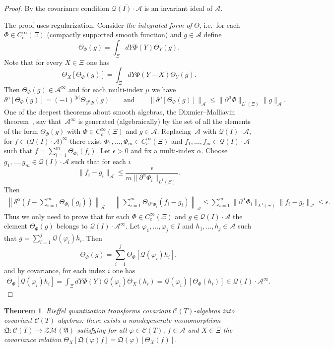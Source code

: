 \documentclass[pdftex]{sigma}
\def\A{{\mathcal A}}
\def\Th{\Theta}
\def\QQ{\mathfrak Q}
\def\AA{\mathfrak A}
\def\C{\mathcal{C}}
\def\Q{\mathcal Q}
\newtheorem{Theorem}{Theorem}[section]
\begin{document}
\begin{proof}
By the covariance condition $\overline{\Q(I)\cdot\A}$ is an invariant ideal of $\A$.

The proof uses regularization. Consider {\it the integrated form of} $\Th$, i.e.\ for each $\Phi\in C_c^\infty(\Xi)$
(compactly supported smooth function) and $g\in\A$ def\/ine
\[
\Th_\Phi(g)=\int_\Xi dY\Phi(Y)\Th_Y(g).
\]
Note that for every $X\in\Xi$ one has
\[
\Th_X\left[\Th_\Phi(g)\right]=\int_\Xi dY\Phi(Y-X)\Th_Y(g).
\]
Then $\Th_\Phi(g)\in\A^\infty$ and for each multi-index $\mu$ we have
\[
\delta^{\mu}\left[\Th_\Phi(g)\right]=(-1)^{|\mu|}\Th_{\partial^{\mu}\Phi}(g)\qquad \text{and}\qquad
\|\delta^{\mu}\left[\Th_\Phi(g)\right]\|_\A \leq \|\partial^{\mu}\Phi\|_{L^1(\Xi)}
\| g\|_\A .
\]
One of the deepest theorems about smooth algebras, the Dixmier--Malliavin theorem~\cite{DM}, say that~$\A^\infty$
is generated (algebraically) by the set of all the elements of the form  $\Th_\Phi(g)$ with $\Phi\in C_c^\infty(\Xi)$ and
$g\in\A$. Replacing~$\A$ with $\overline{\Q(I)\cdot\A}$,
for $f\in\big(\overline{\Q(I)\cdot\A}\big)^\infty$ there exist $\Phi_1,\dots,\Phi_m\in C_c^\infty(\Xi)$ and
$f_1,\dots,f_m\in\overline{\Q(I)\cdot\A}$ such that $f=\sum\limits_{i=1}^m\Th_{\Phi_i}(f_i)$.
Let $\epsilon >0$ and f\/ix a multi-index $\alpha$. Choose $g_1,\dots ,g_m\in\Q(I)\cdot\A$ such that for each $i$
\[
\| f_i-g_i\|_\A \le\frac{\epsilon}{m\|\partial^\alpha\Phi_i\|_{L^1(\Xi)}} .
\]
Then
\begin{gather*}
\left\| \delta^\alpha \left(f-\sum_{i=1}^m\Th_{\Phi_i}(g_i)\right)\right\|_\A=
\left\|\sum_{i=1}^m\Th_{\partial^\alpha\Phi_i}(f_i-g_i)\right\|_\A
\leq
\sum_{i=1}^m\|\partial^\alpha\Phi_i\|_{L^1(\Xi)}\| f_i-g_i\|_\A \le\epsilon .
\end{gather*}
Thus we only need to prove that for each $\Phi\in C_c^\infty(\Xi)$ and $g\in\Q(I)\cdot\A$ the element
$\Th_\Phi(g)$ belongs to $\Q(I)\cdot\A^\infty$. Let $\varphi_1,\dots,\varphi_j\in I$ and
$h_1,\dots,h_j\in\A$ such that $g=\sum\limits_{i=1}^j\Q(\varphi_i)h_i$. Then
\[
\Th_\Phi(g)=\sum_{i=1}^j\Th_\Phi [\Q(\varphi_i)h_i ],
\]
and by covariance, for each index $i$ one has
\begin{gather*}
\Th_\Phi\left[\Q(\varphi_i)h_i\right]=\int_\Xi dY\Phi(Y)\Q(\varphi_i)\Th_X(h_i)=\Q(\varphi_i)
\left[\Th_\Phi(h_i)\right]\in\Q(I)\cdot\A^\infty .\tag*{\qed}
\end{gather*}
\renewcommand{\qed}{}
\end{proof}

\begin{Theorem}\label{crifel}
Rieffel quantization transforms covariant $\C(T)$-algebras into covariant $\C(T)$-algebras: there exists a nondegenerate
monomorphism $\mathfrak Q:\C(T)\rightarrow\mathcal Z\mathcal M(\AA)$ satisfying for all $\varphi\in\C(T)$, $f\in\A$ and
$X\in\Xi$ the covariance relation
$\Th_X[\QQ(\varphi)f]=\QQ(\varphi) [\Th_X(f) ]$.
\end{Theorem}
\end{document}
